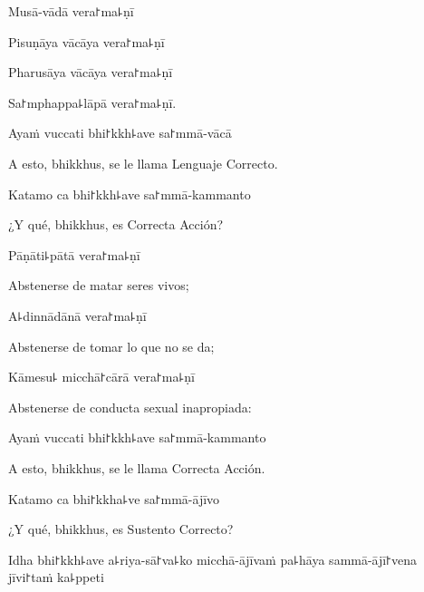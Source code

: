 Musā-vādā vera꜓ma꜕ṇī


Pisuṇāya vācāya vera꜓ma꜕ṇī


Pharusāya vācāya vera꜓ma꜕ṇī


Sa꜓mphappa꜕lāpā vera꜓ma꜕ṇī.


\ifaivedition
\clearpage
\fi

Ayaṁ vuccati bhi꜓kkh꜕ave sa꜓mmā-vācā

\begin{english}
	A esto, bhikkhus, se le llama Lenguaje Correcto.
\end{english}

Katamo ca bhi꜓kkh꜕ave sa꜓mmā-kammanto

\begin{english}
	¿Y qué, bhikkhus, es Correcta Acción?
\end{english}

Pāṇāti꜕pātā vera꜓ma꜕ṇī

\begin{english}
	Abstenerse de matar seres vivos;
\end{english}

A꜕dinnādānā vera꜓ma꜕ṇī

\begin{english}
	Abstenerse de tomar lo que no se da;
\end{english}

Kāmesu꜕ micchā꜓cārā vera꜓ma꜕ṇī

\begin{english}
	Abstenerse de conducta sexual inapropiada:
\end{english}

Ayaṁ vuccati bhi꜓kkh꜕ave sa꜓mmā-kammanto

\begin{english}
	A esto, bhikkhus, se le llama Correcta Acción.
\end{english}

Katamo ca bhi꜓kkha꜕ve sa꜓mmā-ājīvo

\begin{english}
	¿Y qué, bhikkhus, es Sustento Correcto?
\end{english}

Idha bhi꜓kkh꜕ave a꜕riya-sā꜓va꜕ko micchā-ājīvaṁ pa꜕hāya sammā-ājī꜓vena jīvi꜓taṁ ka꜕ppeti

